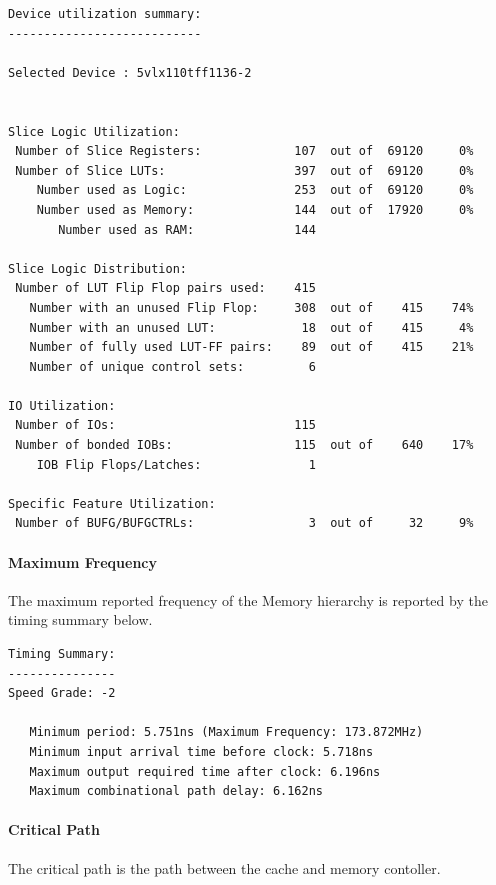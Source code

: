 \documentclass[11pt,letterpaper,]{article}
\begin{document}
\begin{verbatim}
Device utilization summary:
---------------------------

Selected Device : 5vlx110tff1136-2 


Slice Logic Utilization: 
 Number of Slice Registers:             107  out of  69120     0%  
 Number of Slice LUTs:                  397  out of  69120     0%  
    Number used as Logic:               253  out of  69120     0%  
    Number used as Memory:              144  out of  17920     0%  
       Number used as RAM:              144

Slice Logic Distribution: 
 Number of LUT Flip Flop pairs used:    415
   Number with an unused Flip Flop:     308  out of    415    74%  
   Number with an unused LUT:            18  out of    415     4%  
   Number of fully used LUT-FF pairs:    89  out of    415    21%  
   Number of unique control sets:         6

IO Utilization: 
 Number of IOs:                         115
 Number of bonded IOBs:                 115  out of    640    17%  
    IOB Flip Flops/Latches:               1

Specific Feature Utilization:
 Number of BUFG/BUFGCTRLs:                3  out of     32     9%  
\end{verbatim}

\paragraph{ Maximum Frequency }
The maximum reported frequency of the Memory hierarchy is reported by the timing summary below.

\begin{verbatim}
Timing Summary:
---------------
Speed Grade: -2

   Minimum period: 5.751ns (Maximum Frequency: 173.872MHz)
   Minimum input arrival time before clock: 5.718ns
   Maximum output required time after clock: 6.196ns
   Maximum combinational path delay: 6.162ns
\end{verbatim}

\paragraph{ Critical Path }
The critical path is the path between the cache and memory contoller.
\end{document}
